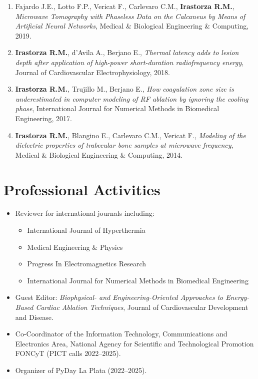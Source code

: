 \documentclass[11pt]{article}
\begin{document}
\begin{enumerate}[leftmargin=*]
\item Fajardo J.E., Lotto F.P., Vericat F., Carlevaro C.M., \textbf{Irastorza R.M.},
\textit{Microwave Tomography with Phaseless Data on the Calcaneus by Means of Artificial Neural Networks},
Medical \& Biological Engineering \& Computing, 2019.

\item \textbf{Irastorza R.M.}, d'Avila A., Berjano E.,
\textit{Thermal latency adds to lesion depth after application of high-power short-duration radiofrequency energy},
Journal of Cardiovascular Electrophysiology, 2018.

\item \textbf{Irastorza R.M.}, Trujillo M., Berjano E.,
\textit{How coagulation zone size is underestimated in computer modeling of RF ablation by ignoring the cooling phase},
International Journal for Numerical Methods in Biomedical Engineering, 2017.

\item \textbf{Irastorza R.M.}, Blangino E., Carlevaro C.M., Vericat F.,
\textit{Modeling of the dielectric properties of trabecular bone samples at microwave frequency},
Medical \& Biological Engineering \& Computing, 2014.

\end{enumerate}

\section*{Professional Activities}

\begin{itemize}[leftmargin=*]
    \item Reviewer for international journals including:
    \begin{itemize}
        \item International Journal of Hyperthermia
        \item Medical Engineering \& Physics
        \item Progress In Electromagnetics Research
        \item International Journal for Numerical Methods in Biomedical Engineering
    \end{itemize}

    \item Guest Editor:
    \textit{Biophysical- and Engineering-Oriented Approaches to Energy-Based Cardiac Ablation Techniques},
    Journal of Cardiovascular Development and Disease.

    \item Co-Coordinator of the Information Technology, Communications and Electronics Area, National Agency for Scientific and Technological Promotion FONCyT (PICT calls 2022--2025).

    \item Organizer of PyDay La Plata (2022--2025).
\end{itemize}
\end{document}
